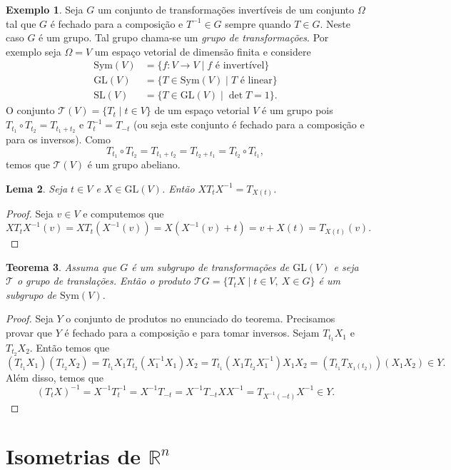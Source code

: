 \documentclass[12pt]{amsart}
\newcommand{\R}{\mathbb R}
\newcommand{\glv}[1]{\mbox{GL}(#1)}
\newcommand{\slv}[1]{\mbox{SL}(#1)}
\newcommand{\Sym}{\mbox{Sym}}
\newtheorem{theorem}{Teorema}
\newtheorem{lemma}[theorem]{Lema}
\theoremstyle{definition}
\newtheorem{example}[theorem]{Exemplo}
\begin{document}
\begin{example}
    Seja $G$ um conjunto de transformações invertíveis de um conjunto $\Omega$ tal que $G$ é fechado para 
    a composição e $T^{-1}\in G$ sempre quando $T\in G$. Neste caso $G$ é um grupo. Tal grupo chama-se 
    um \emph{grupo de transformações}. Por exemplo seja $\Omega=V$ um espaço vetorial de dimensão finita
    e considere 
    \begin{align*}
        \Sym(V)&=\{f:V\to V\mid f \mbox{ é invertível}\}\\
        \glv V&=\{T\in\Sym(V)\mid \mbox{$T$ é linear}\}\\
        \slv V&=\{T\in \glv V\mid \det T=1\}.
    \end{align*}
    O conjunto $\mathcal T(V)=\{T_t\mid t\in V\}$ de um espaço vetorial $V$ é um grupo pois 
    $T_{t_1}\circ T_{t_2}=T_{t_1+t_2}$ e $T_{t}^{-1}=T_{-t}$ (ou seja este conjunto é fechado para  
    a composição e para os inversos). Como 
    \[
        T_{t_1}\circ T_{t_2}=T_{t_1+t_2}=T_{t_2+t_1}=T_{t_2}\circ T_{t_1},
    \]
    temos que $\mathcal T(V)$ é um grupo abeliano.
\end{example}

\begin{lemma}
    Seja $t\in V$ e $X\in \glv V$. Então $XT_tX^{-1}=T_{X(t)}$.  
\end{lemma}
\begin{proof}
    Seja $v\in V$ e computemos que 
    \[
        XT_tX^{-1}(v)=XT_t(X^{-1}(v))=X(X^{-1}(v)+t)=v+X(t)=T_{X(t)}(v).
    \]
\end{proof}

\begin{theorem}
    Assuma que $G$ é um subgrupo de transformações de $\glv V$ e seja $\mathcal T$ o grupo de translações. 
    Então o produto $\mathcal TG=\{T_tX\mid t\in V,\ X\in G\}$ é um subgrupo de $\Sym(V)$. 
\end{theorem}
\begin{proof}
    Seja $Y$ o conjunto de produtos no enunciado do teorema. Precisamos provar que $Y$ é fechado para 
    a composição e para tomar inversos. Sejam $T_{t_1}X_1$ e $T_{t_2}X_2$. Então temos que 
    \[
        (T_{t_1}X_{1})(T_{t_2}X_2)=T_{t_1}X_{1}T_{t_2}(X_1^{-1}X_1)X_2=
        T_{t_1}(X_{1}T_{t_2}X_1^{-1})X_1X_2=(T_{t_1}T_{X_1(t_2)})(X_1X_2)\in Y.
    \]  
    Além disso, temos que 
    \[
        (T_tX)^{-1}=X^{-1}T_t^{-1}=X^{-1}T_{-t}=X^{-1}T_{-t}XX^{-1}=T_{X^{-1}(-t)}X^{-1}\in Y.
    \]
\end{proof}
\section{Isometrias de $\R^n$}
\end{document}
